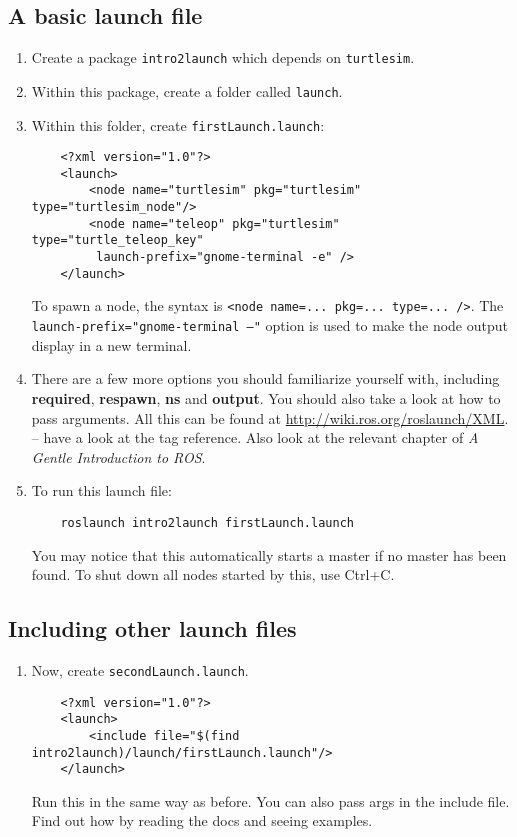 \documentclass{article}
\begin{document}
        \subsection{A basic launch file}
        \begin{enumerate}
            \item Create a package \texttt{intro2launch} which depends on \texttt{turtlesim}.
            \item Within this package, create a folder called \texttt{launch}.
            \item Within this folder, create \texttt{firstLaunch.launch}:
            \begin{verbatim}
    <?xml version="1.0"?>
    <launch>
        <node name="turtlesim" pkg="turtlesim" type="turtlesim_node"/>
        <node name="teleop" pkg="turtlesim" type="turtle_teleop_key"
         launch-prefix="gnome-terminal -e" />
    </launch>
            \end{verbatim}
    
            To spawn a node, the syntax is \texttt{<node name=... pkg=... type=... />}.
            The \texttt{launch-prefix="gnome-terminal --"} option is used to make the node output
            display in a new terminal.
            \item There are a few more options you should familiarize yourself with, including 
            \textbf{required}, \textbf{respawn}, \textbf{ns} and \textbf{output}. You should 
            also take a look at how to pass arguments. All this can be found at \url{http://wiki.ros.org/roslaunch/XML}.
            -- have a look at the tag reference. Also look at the relevant chapter of \emph{A Gentle Introduction to ROS}.
            \item To run this launch file:
            \begin{verbatim}
    roslaunch intro2launch firstLaunch.launch
            \end{verbatim}
            You may notice that this automatically starts a master if no master has been found.
            To shut down all nodes started by this, use Ctrl+C.
        \end{enumerate}
        \subsection{Including other launch files}
        \begin{enumerate}
            \item Now, create \texttt{secondLaunch.launch}.
            \begin{verbatim}
    <?xml version="1.0"?>
    <launch>
        <include file="$(find intro2launch)/launch/firstLaunch.launch"/>
    </launch>
            \end{verbatim}
            Run this in the same way as before. You can also pass args in the include file. Find out 
            how by reading the docs and seeing examples.
        \end{enumerate}
\end{document}
